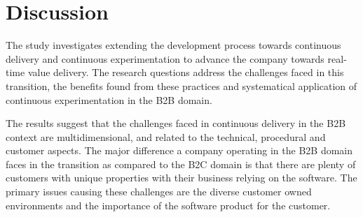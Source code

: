 \documentclass[english]{tktltiki2}
\theoremstyle{definition}
\theoremstyle{remark}
\begin{document}




\section{Discussion}

The study investigates extending the development process towards continuous delivery and continuous experimentation to advance the company towards real-time value delivery. The research questions address the challenges faced in this transition, the benefits found from these practices and systematical application of continuous experimentation in the B2B domain. 


%



The results suggest that the challenges faced in continuous delivery in the B2B context are multidimensional, and related to the technical, procedural and customer aspects. The major difference a company operating in the B2B domain faces in the transition as compared to the B2C domain is that there are plenty of customers with unique properties with their business relying on the software. The primary issues causing these challenges are the diverse customer owned environments and the importance of the software product for the customer. 
\end{document}
